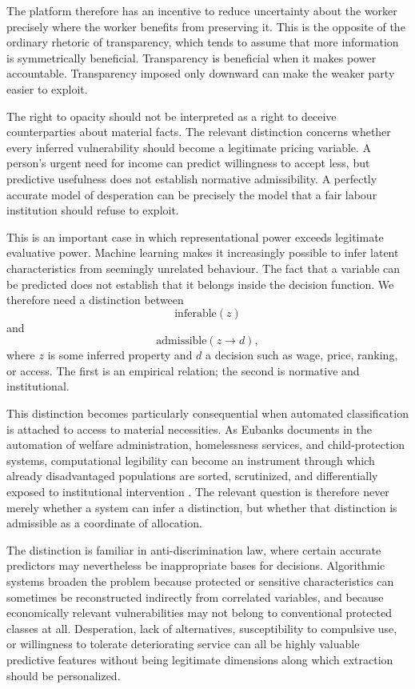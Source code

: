 \documentclass[11pt]{article}
\begin{document}
The platform therefore has an incentive to reduce uncertainty about the worker precisely where the worker benefits from preserving it. This is the opposite of the ordinary rhetoric of transparency, which tends to assume that more information is symmetrically beneficial. Transparency is beneficial when it makes power accountable. Transparency imposed only downward can make the weaker party easier to exploit.

The right to opacity should not be interpreted as a right to deceive counterparties about material facts. The relevant distinction concerns whether every inferred vulnerability should become a legitimate pricing variable. A person's urgent need for income can predict willingness to accept less, but predictive usefulness does not establish normative admissibility. A perfectly accurate model of desperation can be precisely the model that a fair labour institution should refuse to exploit.

This is an important case in which representational power exceeds legitimate evaluative power. Machine learning makes it increasingly possible to infer latent characteristics from seemingly unrelated behaviour. The fact that a variable can be predicted does not establish that it belongs inside the decision function. We therefore need a distinction between
\[
\text{inferable}(z)
\]
and
\[
\text{admissible}(z\rightarrow d),
\]
where \(z\) is some inferred property and \(d\) a decision such as wage, price, ranking, or access. The first is an empirical relation; the second is normative and institutional.

This distinction becomes particularly consequential when automated classification is attached to access to material necessities. As Eubanks documents in the automation of welfare administration, homelessness services, and child-protection systems, computational legibility can become an instrument through which already disadvantaged populations are sorted, scrutinized, and differentially exposed to institutional intervention \citep{eubanks2018automating}. The relevant question is therefore never merely whether a system can infer a distinction, but whether that distinction is admissible as a coordinate of allocation.

The distinction is familiar in anti-discrimination law, where certain accurate predictors may nevertheless be inappropriate bases for decisions. Algorithmic systems broaden the problem because protected or sensitive characteristics can sometimes be reconstructed indirectly from correlated variables, and because economically relevant vulnerabilities may not belong to conventional protected classes at all. Desperation, lack of alternatives, susceptibility to compulsive use, or willingness to tolerate deteriorating service can all be highly valuable predictive features without being legitimate dimensions along which extraction should be personalized.
\end{document}
